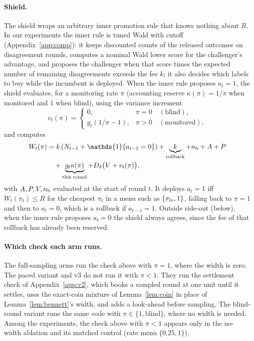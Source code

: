 \documentclass[10pt]{article}
\theoremstyle{plain}
\theoremstyle{definition}
\newcommand{\one}{\mathds{1}}
\begin{document}
\paragraph{Shield.}
The shield wraps an arbitrary inner promotion rule that knows nothing about $R$. In our experiments the inner rule is tuned Wald with cutoff (Appendix~\ref{app:comp}): it keeps discounted counts of the released outcomes on disagreement rounds, computes a nominal Wald lower score for the challenger's advantage, and proposes the challenger when that score times the expected number of remaining disagreements exceeds the fee $k$; it also decides which labels to buy while the incumbent is deployed. When the inner rule proposes $a_t=1$, the shield evaluates, for a monitoring rate $\pi$ (accounting reserve $\kappa(\pi)=1/\pi$ when monitored and $1$ when blind), using the variance increment
\[
v_t(\pi)=\begin{cases}0,&\pi=0\quad(\text{blind}),\\g_t(1/\pi-1),&\pi>0\quad(\text{monitored}),\end{cases}
\]
and computes
{\small\begin{align*}
W_t(\pi)&=k\,(N_{t-1}+\one\{a_{t-1}=0\})+\underbrace{k}_{\text{rollback}}+n_{\rm b}+A+P\\
 &\quad+\underbrace{g_t\kappa(\pi)}_{\text{this round}}+D_\delta\big(V+v_t(\pi)\big),
\end{align*}}
with $A,P,V,n_{\rm b}$ evaluated at the start of round $t$. It deploys $a_t=1$ iff $W_t(\pi_t)\le R$ for the cheapest $\pi_t$ in a menu such as $\{\pi_{\rm lo},1\}$, falling back to $\pi=1$ and then to $a_t=0$, which is a rollback if $a_{t-1}=1$. Outside ride-out (below), when the inner rule proposes $a_t=0$ the shield always agrees, since the fee of that rollback has already been reserved.

\paragraph{Which check each arm runs.}
The full-sampling arms run the check above with $\pi=1$, where the width is zero. The paced variant and v3 do not run it with $\pi<1$. They run the settlement check of Appendix~\ref{app:v2}, which books a sampled round at one unit until it settles, uses the exact-coin mixture of Lemma~\ref{lem:coin} in place of Lemma~\ref{lem:bennett}'s width, and adds a look-ahead before sampling. The blind-round variant runs the same code with $\pi\in\{1,\text{blind}\}$, where no width is needed. Among the experiments, the check above with $\pi<1$ appears only in the no-width ablation and its matched control (rate menu $\{0.25,1\}$).
\end{document}
